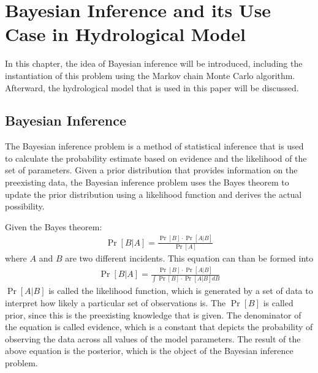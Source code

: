 \chapter{Bayesian Inference and its Use Case in Hydrological Model}

In this chapter, the idea of Bayesian inference will be introduced, including the instantiation of this problem using the Markov chain Monte Carlo algorithm. Afterward, the hydrological model that is used in this paper will be discussed.

\section{Bayesian Inference}
The Bayesian inference problem is a method of statistical inference that is used to calculate the probability estimate based on evidence and the likelihood of the set of parameters.\cite{bayesian_inference} Given a prior distribution that provides information on the preexisting data, the Bayesian inference problem uses the Bayes theorem to update the prior distribution using a likelihood function and derives the actual possibility.

Given the Bayes theorem:\cite{SatzBayes}
\begin{align}
    \Pr[B|A] = \frac{\Pr[B]\cdot\Pr[A|B]}{\Pr[A]}
\end{align}
where $A$ and $B$ are two different incidents. This equation can than be formed into
\begin{align}
    \Pr[B|A] = \frac{\Pr[B]\cdot\Pr[A|B]}{\int\Pr[B]\cdot\Pr[A|B]dB}
\end{align}
$\Pr[A|B]$ is called the likelihood function, which is generated by a set of data to interpret how likely a particular set of observations is.\cite{likelihood_idea} The $\Pr[B]$ is called prior, since this is the preexisting knowledge that is given.\cite{prior} The denominator of the equation is called evidence, which is a constant that depicts the probability of observing the data across all values of the model parameters.\cite{mcmc_practice} The result of the above equation is the posterior, which is the object of the Bayesian inference problem.\cite{mcmc_practice}

